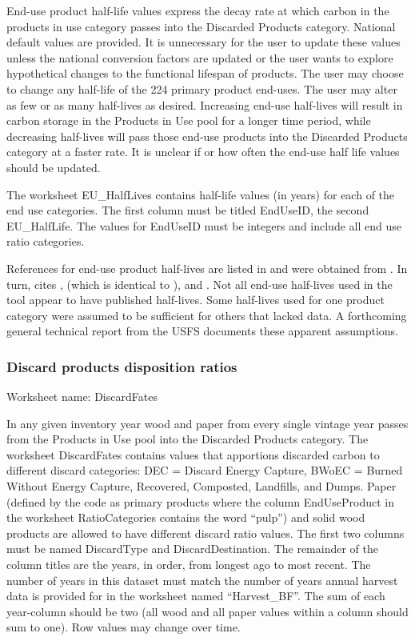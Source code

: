 \documentclass[
  openany]{book}
\begin{document}
End-use product half-life values express the decay rate at which carbon in the products in use category passes into the Discarded Products category. National default values are provided. It is unnecessary for the user to update these values unless the national conversion factors are updated or the user wants to explore hypothetical changes to the functional lifespan of products. The user may choose to change any half-life of the 224 primary product end-uses. The user may alter as few or as many half-lives as desired. Increasing end-use half-lives will result in carbon storage in the Products in Use pool for a longer time period, while decreasing half-lives will pass those end-use products into the Discarded Products category at a faster rate. It is unclear if or how often the end-use half life values should be updated.

The worksheet EU\_HalfLives contains half-life values (in years) for each of the end use categories. The first column must be titled EndUseID, the second EU\_HalfLife. The values for EndUseID must be integers and include all end use ratio categories.

References for end-use product half-lives are listed in and were obtained from \textcite{smith2006}. In turn, \textcite{smith2006} cites \textcite{skog1998}, \textcite{skog2000} (which is identical to \textcite{skog1998}), and \textcite{row1996}. Not all end-use half-lives used in the tool appear to have published half-lives. Some half-lives used for one product category were assumed to be sufficient for others that lacked data. A forthcoming general technical report from the USFS documents these apparent assumptions.

\hypertarget{own-prov-input-discFates}{%
\subsubsection{Discard products disposition ratios}\label{own-prov-input-discFates}}

Worksheet name: DiscardFates

In any given inventory year wood and paper from every single vintage year passes from the Products in Use pool into the Discarded Products category. The worksheet DiscardFates contains values that apportions discarded carbon to different discard categories: DEC = Discard Energy Capture, BWoEC = Burned Without Energy Capture, Recovered, Composted, Landfills, and Dumps. Paper (defined by the code as primary products where the column EndUseProduct in the worksheet RatioCategories contains the word ``pulp'') and solid wood products are allowed to have different discard ratio values. The first two columns must be named DiscardType and DiscardDestination. The remainder of the column titles are the years, in order, from longest ago to most recent. The number of years in this dataset must match the number of years annual harvest data is provided for in the worksheet named ``Harvest\_BF''. The sum of each year-column should be two (all wood and all paper values within a column should sum to one). Row values may change over time.
\end{document}
